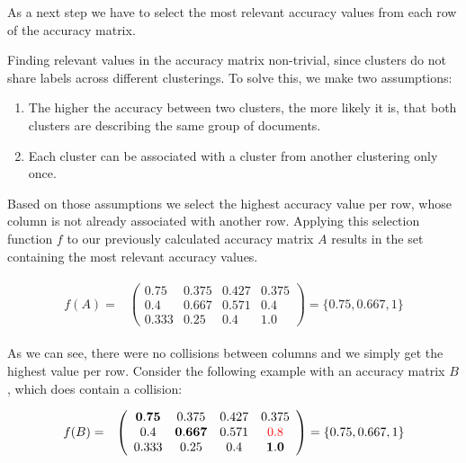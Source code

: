 As a next step we have to select the most relevant accuracy values from each row of the accuracy matrix. 

Finding relevant values in the accuracy matrix non-trivial, since clusters do not share labels across different clusterings. To solve this, we make two assumptions:
\begin{enumerate} 
\item The higher the accuracy between two clusters, the more likely it is, that both clusters are describing the same group of documents. 
\item Each cluster can be associated with a cluster from another clustering only once.
\end{enumerate}

Based on those assumptions we select the highest accuracy value per row, whose column is not already associated with another row. Applying this selection function $f$ to our previously calculated accuracy matrix $A$ results in the set containing the most relevant accuracy values.

\begin{gather*}
    \begin{array}{rcl}
        f(A) = & \left(\begin{array}{cccc}
                \mathbf{0.75} & 0.375 & 0.427 & 0.375 \\
                0.4 & \mathbf{0.667} & 0.571 & 0.4 \\
                0.333 &  0.25 & 0.4 & \mathbf{1.0} \end{array}\right)
            = \{0.75, 0.667, 1\}
    \end{array}
\end{gather*}

As we can see, there were no collisions between columns and we simply get the highest value per row. Consider the following example with an accuracy matrix $B$, which does contain a collision:

\begin{gather*}
    \begin{array}{rcl}
        f(B) = & \left(\begin{array}{cccc}
            \mathbf{0.75} & 0.375 & 0.427 & 0.375 \\
            0.4 & \mathbf{0.667} & 0.571 & \textcolor{red}{0.8} \\
            0.333 &  0.25 & 0.4 & \mathbf{1.0} \end{array}\right)
            = \{0.75, 0.667, 1\}
    \end{array}
\end{gather*}

